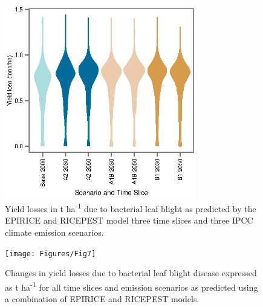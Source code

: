     \begin{figure}
      \includegraphics[width = 84mm]{Figures/Fig6}
      \caption{Yield losses in t ha\textsuperscript{-1} due to bacterial leaf blight as predicted by the EPIRICE and RICEPEST model three time slices and three IPCC climate emission scenarios.}
      \label{Fig6}
    \end{figure}
    
    
    \begin{figure}
      \texttt{[image: Figures/Fig7]}
      \caption{Changes in yield losses due to bacterial leaf blight disease expressed as t ha\textsuperscript{-1} for all time slices and emission scenarios as predicted using a combination of EPIRICE and RICEPEST models. }
      \label{Fig7}
    \end{figure}





